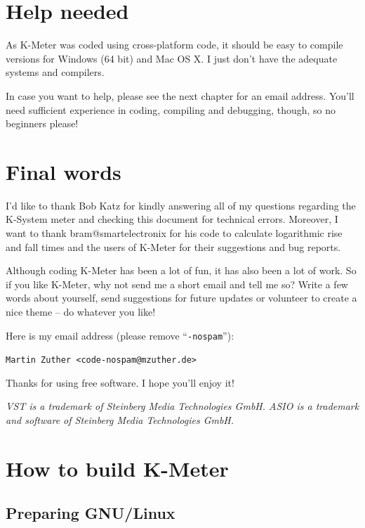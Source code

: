 \chapter{Help needed}
\label{chap:help_needed}

As K-Meter was coded using cross-platform code, it should be easy to
compile versions for Windows (\num{64} bit) and Mac OS X.  I just
don’t have the adequate systems and compilers.

In case you want to help, please see the next chapter for an email
address.  You’ll need sufficient experience in coding, compiling and
debugging, though, so no beginners please!

\chapter{Final words}
\label{chap:final_words}

I'd like to thank Bob Katz for kindly answering all of my questions
regarding the K-System meter and checking this document for technical
errors.  Moreover, I want to thank bram@smartelectronix for his code
to calculate logarithmic rise and fall times and the users of K-Meter
for their suggestions and bug reports.

Although coding K-Meter has been a lot of fun, it has also been a lot
of work.  So if you like K-Meter, why not send me a short email and
tell me so?  Write a few words about yourself, send suggestions for
future updates or volunteer to create a nice theme -- do whatever you
like!

Here is my email address (please remove ``\texttt{-nospam}''):

\begin{center}
  \texttt{Martin Zuther <code-nospam@mzuther.de>}
\end{center}

Thanks for using free software.  I hope you'll enjoy it!

\emph{VST is a trademark of Steinberg Media Technologies GmbH.  ASIO
  is a trademark and software of Steinberg Media Technologies GmbH.}

\appendix

\chapter{How to build K-Meter}
\label{chap:build_kmeter}

\section{Preparing GNU/Linux}

